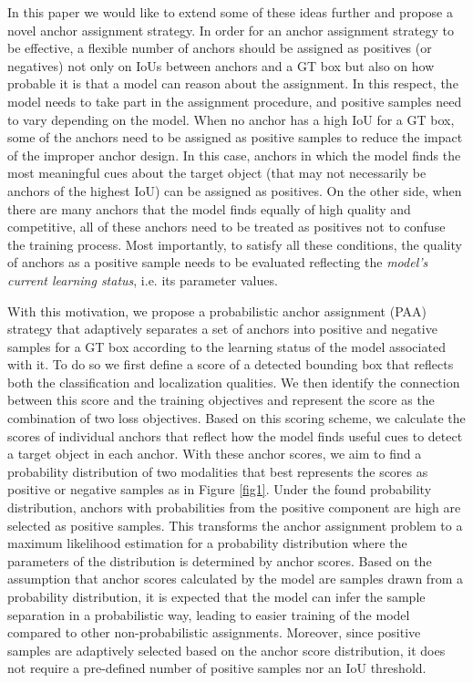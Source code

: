\documentclass[runningheads]{llncs}
\begin{document}
In this paper we would like to extend some of these ideas further and propose a novel anchor assignment strategy. In order for an anchor assignment strategy to be effective, a flexible number of anchors should be assigned as positives (or negatives) not only on IoUs between anchors and a GT box but also on how probable it is that a model can reason about the assignment. In this respect, the model needs to take part in the assignment procedure, and positive samples need to vary depending on the model. When no anchor has a high IoU for a GT box, some of the anchors need to be assigned as positive samples to reduce the impact of the improper anchor design. In this case, anchors in which the model finds the most meaningful cues about the target object (that may not necessarily be anchors of the highest IoU) can be assigned as positives. On the other side, when there are many anchors that the model finds equally of high quality and competitive, all of these anchors need to be treated as positives not to confuse the training process. Most importantly, to satisfy all these conditions, the quality of anchors as a positive sample needs to be evaluated reflecting the \textit{model's current learning status}, i.e. its parameter values.

With this motivation, we propose a probabilistic anchor assignment (PAA) strategy that adaptively separates a set of anchors into positive and negative samples for a GT box according to the learning status of the model associated with it. To do so we first define a score of a detected bounding box that reflects both the classification and localization qualities. We then identify the connection between this score and the training objectives and represent the score as the combination of two loss objectives. Based on this scoring scheme, we calculate the scores of individual anchors that reflect how the model finds useful cues to detect a target object in each anchor. With these anchor scores, we aim to find a probability distribution of two modalities that best represents the scores as positive or negative samples as in Figure \ref{fig1}. Under the found probability distribution, anchors with probabilities from the positive component are high are selected as positive samples. This transforms the anchor assignment problem to a maximum likelihood estimation for a probability distribution where the parameters of the distribution is determined by anchor scores. Based on the assumption that anchor scores calculated by the model are samples drawn from a probability distribution, it is expected that the model can infer the sample separation in a probabilistic way, leading to easier training of the model compared to other non-probabilistic assignments. Moreover, since positive samples are adaptively selected based on the anchor score distribution, it does not require a pre-defined number of positive samples nor an IoU threshold.
\end{document}
